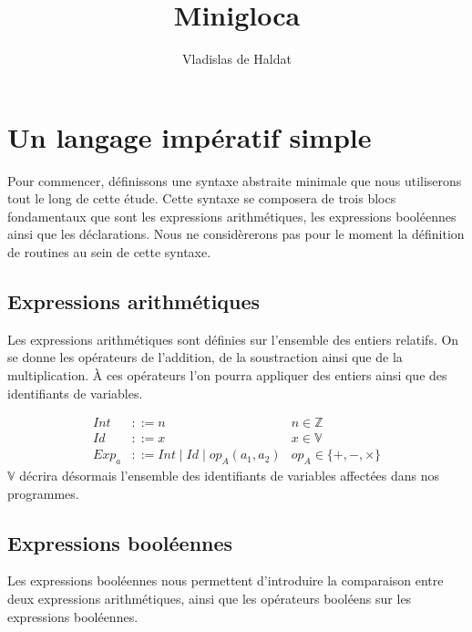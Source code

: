 \documentclass[a4paper, 11pt]{article}
\title{Minigloca}
\author{Vladislas de Haldat}
\begin{document}


\maketitle
\newpage
\tableofcontents
\newpage

\section{Un langage impératif simple}
Pour commencer, définissons une syntaxe abstraite minimale que nous utiliserons tout le long de cette étude.
Cette syntaxe se composera de trois blocs fondamentaux que sont les expressions arithmétiques, les expressions
booléennes ainsi que les déclarations. Nous ne considèrerons pas pour le moment la définition de routines au sein de cette syntaxe.

\subsection{Expressions arithmétiques}
Les expressions arithmétiques sont définies sur l'ensemble des entiers relatifs. On se donne les opérateurs
de l'addition, de la soustraction ainsi que de la multiplication. À ces opérateurs l'on pourra appliquer des
entiers ainsi que des identifiants de variables.


\begin{align*}
  Int   & ::= n                               & n \in \mathbb{Z}          \\
  Id    & ::= x	  							  & x \in \mathbb{V}          \\
  Exp_a & ::= Int \mid Id \mid op_A(a_1, a_2) & op_A \in \{+, -, \times\}
\end{align*}
$\mathbb{V}$ décrira désormais l'ensemble des identifiants de variables affectées dans nos programmes. 
\subsection{Expressions booléennes}
Les expressions booléennes nous permettent d'introduire la comparaison entre deux expressions arithmétiques,
ainsi que les opérateurs booléens sur les expressions booléennes.
\end{document}
